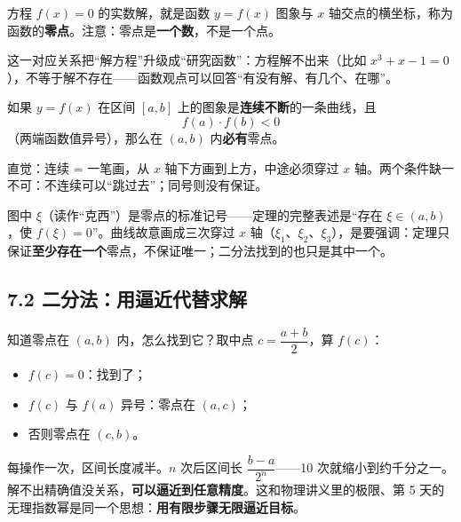 \documentclass[UTF8,a4paper,11pt]{ctexart}
\begin{document}
方程 $f(x) = 0$ 的实数解，就是函数 $y = f(x)$ 图象与 $x$ 轴交点的横坐标，称为函数的\textbf{零点}。注意：零点是\textbf{一个数}，不是一个点。

这一对应关系把“解方程”升级成“研究函数”：方程解不出来（比如 $x^3 + x - 1 = 0$），不等于解不存在——函数观点可以回答“有没有解、有几个、在哪”。

\begin{keyconcept}[零点存在定理]
如果 $y = f(x)$ 在区间 $[a, b]$ 上的图象是\textbf{连续不断}的一条曲线，且
\[
f(a) \cdot f(b) < 0
\]
（两端函数值异号），那么在 $(a, b)$ 内\textbf{必有}零点。

直觉：连续 = 一笔画，从 $x$ 轴下方画到上方，中途必须穿过 $x$ 轴。两个条件缺一不可：不连续可以“跳过去”；同号则没有保证。
\end{keyconcept}

\begin{center}
\end{center}

图中 $\xi$（读作“克西”）是零点的标准记号——定理的完整表述是“存在 $\xi \in (a,b)$，使 $f(\xi) = 0$”。曲线故意画成三次穿过 $x$ 轴（$\xi_1$、$\xi_2$、$\xi_3$），是要强调：定理只保证\textbf{至少存在一个}零点，不保证唯一；二分法找到的也只是其中一个。

\subsection*{7.2 二分法：用逼近代替求解}

知道零点在 $(a, b)$ 内，怎么找到它？取中点 $c = \dfrac{a+b}{2}$，算 $f(c)$：
\begin{itemize}
  \item $f(c) = 0$：找到了；
  \item $f(c)$ 与 $f(a)$ 异号：零点在 $(a, c)$；
  \item 否则零点在 $(c, b)$。
\end{itemize}
每操作一次，区间长度减半。$n$ 次后区间长 $\dfrac{b-a}{2^n}$——10 次就缩小到约千分之一。解不出精确值没关系，\textbf{可以逼近到任意精度}。这和物理讲义里的极限、第 5 天的无理指数幂是同一个思想：\textbf{用有限步骤无限逼近目标}。
\end{document}
